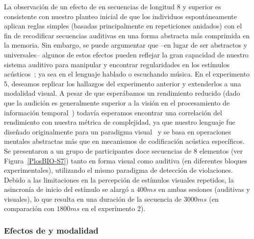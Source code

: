 La observación de un efecto de \mdlbin en secuencias de longitud 8 y superior es consistente con nuestro planteo inicial de que los individuos espontáneamente aplican reglas simples (basadas principalmente en repeticiones anidados) con el fin de recodificar secuencias auditivas en una forma abstracta más comprimida en la memoria. Sin embargo, se puede argumentar que --en lugar de ser abstractos y universales-- algunos de estos efectos pueden reflejar la gran capacidad de nuestro sistema auditivo para manipular y encontrar regularidades en los estímulos acústicos~\cite{f90}; ya sea en el lenguaje hablado o escuchando música. En el experimento 5, deseamos replicar los hallazgos del experimento anterior y extenderlos a una modalidad visual. A pesar de que esperábamos un rendimiento reducido (dado que la audición es generalmente superior a la visión en el procesamiento de información temporal~\cite{f91}) todavía esperamos encontrar una correlación del rendimiento con nuestra métrica de complejidad, ya que nuestro lenguaje fue diseñado originalmente para un paradigma visual~\cite{amalric2017language} y se basa en operaciones mentales abstractas más que en mecanismos de codificación acústica específicos. Se presentaron a un grupo de participantes doce secuencias de 8 elementos (ver Figura~\ref{PlosBIO-S7}) tanto en forma visual como auditiva (en diferentes bloques experimentales), utilizando el mismo paradigma de detección de violaciones. Debido a las limitaciones en la percepción de estímulos visuales repetidos, la asincronía de inicio del estímulo se alargó a $400ms$ en ambas sesiones (auditivas y visuales), lo que resulta en una duración de la secuencia de $3000ms$ (en comparación con $1800ms$ en el experimento 2).

\subsubsection*{Efectos de \mdlbin y modalidad}




